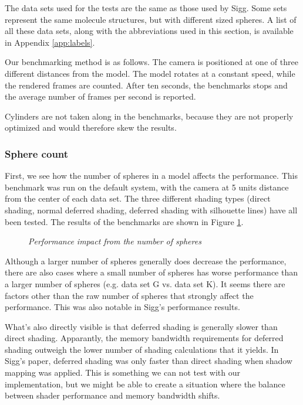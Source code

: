 The data sets used for the tests are the same as those used by Sigg. 
Some sets represent the same molecule structures, but with different sized spheres.
A list of all these data sets, along with the abbreviations used in this section, is available in Appendix \ref{app:labels}.

Our benchmarking method is as follows. 
The camera is positioned at one of three different distances from the model. 
The model rotates at a constant speed, while the rendered frames are counted.
After ten seconds, the benchmarks stops and the average number of frames per second is reported.

Cylinders are not taken along in the benchmarks, because they are not properly optimized and would therefore skew the results.

\subsubsection*{Sphere count}

First, we see how the number of spheres in a model affects the performance. 
This benchmark was run on the default system, with the camera at 5 units distance from the center of each data set.
The three different shading types (direct shading, normal deferred shading, deferred shading with silhouette lines) have all been tested.
The results of the benchmarks are shown in Figure \ref{f:spherecount}.

\begin{figure}[!ht]
\centering
{}
\caption{\em Performance impact from the number of spheres}
\label{f:spherecount}
\end{figure}

Although a larger number of spheres generally does decrease the performance, 
there are also cases where a small number of spheres has worse performance than a larger number of spheres (e.g. data set G vs. data set K).
It seems there are factors other than the raw number of spheres that strongly affect the performance.
This was also notable in Sigg's performance results.

What's also directly visible is that deferred shading is generally slower than direct shading.
Apparantly, the memory bandwidth requirements for deferred shading outweigh the lower number of shading calculations that it yields.
In Sigg's paper, deferred shading was only faster than direct shading when shadow mapping was applied.
This is something we can not test with our implementation, but we might be able to create a situation where the balance between 
shader performance and memory bandwidth shifts.

